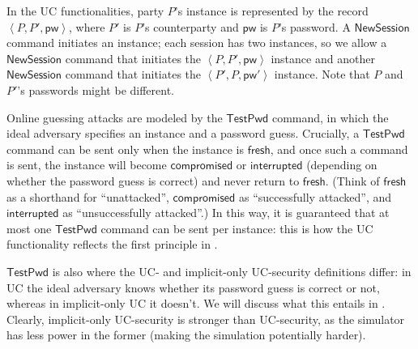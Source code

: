 \documentclass{article}
\newcommand{\pw}{\mathsf{pw}}
\newcommand{\NewSession}{\mathsf{NewSession}}
\newcommand{\TestPwd}{\mathsf{TestPwd}}
\newcommand{\fresh}{\mathsf{fresh}}
\newcommand{\compromised}{\mathsf{compromised}}
\newcommand{\interrupted}{\mathsf{interrupted}}
\begin{document}
In the UC functionalities, party $P$'s instance is represented by the record $\left<P,P',\pw\right>$, where $P'$ is $P$'s counterparty and $\pw$ is $P$'s password. A $\NewSession$ command initiates an instance; each session has two instances, so we allow a $\NewSession$ command that initiates the $\left<P,P',\pw\right>$ instance and another $\NewSession$ command that initiates the $\left<P',P,\pw'\right>$ instance. Note that $P$ and $P'$'s passwords might be different.

Online guessing attacks are modeled by the $\TestPwd$ command, in which the ideal adversary specifies an instance and a password guess. Crucially, a $\TestPwd$ command can be sent only when the instance is $\fresh$, and once such a command is sent, the instance will become $\compromised$ or $\interrupted$ (depending on whether the password guess is correct) and never return to $\fresh$. (Think of $\fresh$ as a shorthand for ``unattacked'', $\compromised$ as ``successfully attacked'', and $\interrupted$ as ``unsuccessfully attacked''.) In this way, it is guaranteed that at most one $\TestPwd$ command can be sent per instance: this is how the UC functionality reflects the first principle in .

$\TestPwd$ is also where the UC- and implicit-only UC-security definitions differ: in UC the ideal adversary knows whether its password guess is correct or not, whereas in implicit-only UC it doesn't. We will discuss what this entails in . Clearly, implicit-only UC-security is stronger than UC-security, as the simulator has less power in the former (making the simulation potentially harder).
\end{document}
